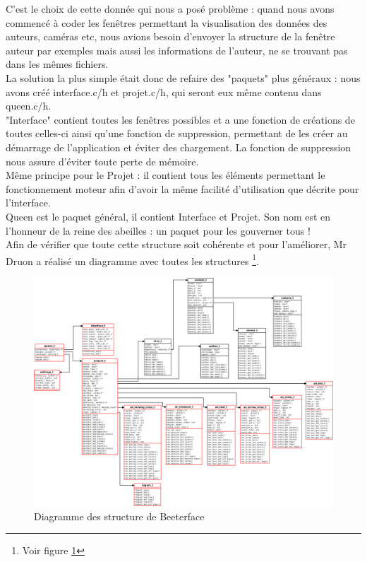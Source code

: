 \documentclass[11pt,french,a4paper]{report}
\begin{document}
C'est le choix de cette donnée qui nous a posé problème : quand nous avons commencé
à coder les fenêtres permettant la visualisation des données des auteurs, caméras etc, nous avions besoin d'envoyer la structure
de la fenêtre auteur par exemples mais aussi les informations de l'auteur, ne se trouvant pas dans les mêmes fichiers.  \\
La solution la plus simple était donc de refaire des "paquets" plus généraux : nous avons créé interface.c/h et projet.c/h, qui seront eux
même contenu dans queen.c/h. \\
"Interface" contient toutes les fenêtres possibles et a une fonction de créations de toutes celles-ci ainsi qu'une fonction de suppression, 
permettant de les créer au démarrage de l'application et éviter des chargement. La fonction de suppression nous assure d'éviter toute perte de mémoire.\\
Même principe pour le Projet : il contient tous les éléments permettant le fonctionnement moteur afin d'avoir la même facilité
d'utilisation que décrite pour l'interface. \\
Queen est le paquet général, il contient Interface et Projet. Son nom est en l'honneur de la reine des abeilles : 
un paquet pour les gouverner tous ! \\
Afin de vérifier que toute cette structure soit cohérente et pour l'améliorer, Mr Druon a réalisé un diagramme 
avec toutes les structures \footnote{Voir figure \ref{dia_struct}}.
\begin{landscape}
\begin{figure}[!h]
    \centering
    \includegraphics[scale=0.3]{../images/dia/beeterface_structs.png}
    \caption{Diagramme des structure de Beeterface}
    \label{dia_struct}
\end{figure}
\end{landscape}
\end{document}
